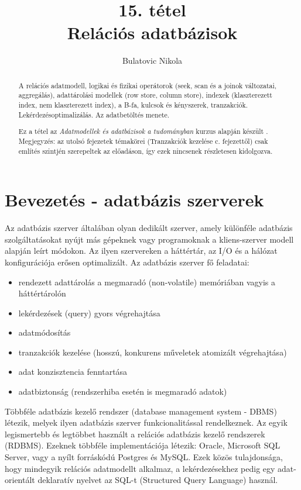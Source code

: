 \documentclass[12pt]{article}
\theoremstyle{plain}
\begin{document}
\title{15. tétel \\ Relációs adatbázisok}
\author{Bulatovic Nikola}

\maketitle

\begin{abstract}
     A relációs adatmodell, logikai és fizikai operátorok (seek, scan és a joinok változatai, aggregálás), adattárolási modellek (row store, column store), indexek (klaszterezett index, nem klaszterezett index), a B-fa, kulcsok és kényszerek, tranzakciók. Lekérdezésoptimalizálás. Az adatbetöltés menete. \par
     Ez a tétel az \textit{Adatmodellek és adatbázisok a tudományban} kurzus alapján készült \cite{db}. Megjegyzés: az utolsó fejezetek témakörei (Tranzakciók kezelése c. fejezettől) csak említés szintjén szerepeltek az előadáson, így ezek nincsenek részletesen kidolgozva.
\end{abstract}

\tableofcontents
\newpage


\section{Bevezetés - adatbázis szerverek}

Az adatbázis szerver általában olyan dedikált szerver, amely különféle adatbázis szolgáltatásokat nyújt más gépeknek vagy programoknak a kliens-szerver modell alapján leírt módokon. Az ilyen szervereken a háttértár, az I/O és a hálózat konfigurációja erősen optimalizált. Az adatbázis szerver fő feladatai:
\begin{itemize}
    \item rendezett adattárolás a megmaradó (non-volatile) memóriában vagyis a háttértárolón
    \item lekérdezések (query) gyors végrehajtása
    \item adatmódosítás
    \item tranzakciók kezelése (hosszú, konkurens műveletek atomizált végrehajtása)
    \item adat konzisztencia fenntartása
    \item adatbiztonság (rendszerhiba esetén is megmaradó adatok)
\end{itemize}{}
Többféle adatbázis kezelő rendszer (database management system - DBMS) létezik, melyek ilyen adatbázis szerver funkcionalitással rendelkeznek. Az egyik legismertebb és legtöbbet használt a relációs adatbázis kezelő rendszerek (RDBMS). Ezeknek többféle implementációja létezik: Oracle, Microsoft SQL Server, vagy a nyílt forráskódú Postgres és MySQL. Ezek közös tulajdonsága, hogy mindegyik relációs adatmodellt alkalmaz, a lekérdezésekhez pedig egy adat-orientált deklaratív nyelvet az SQL-t (Structured Query Language) használ. 
\end{document}
